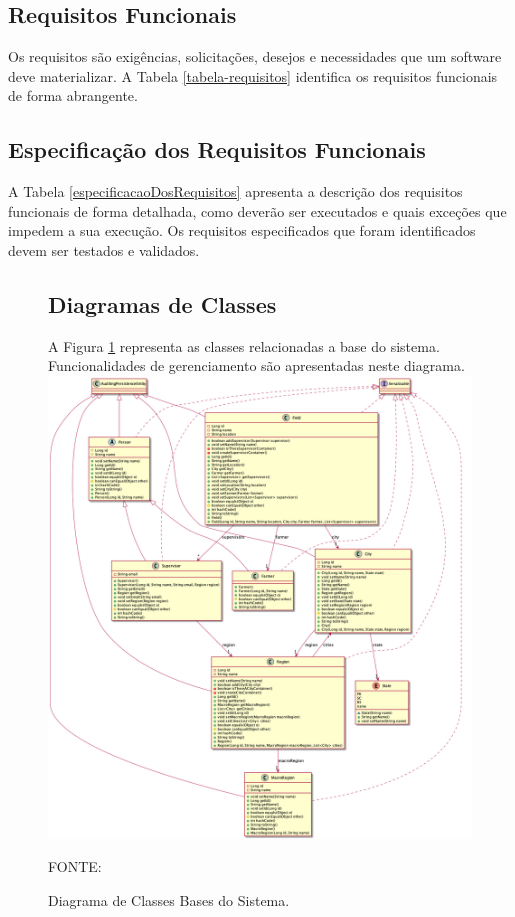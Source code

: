 \subsection{Requisitos Funcionais}
Os requisitos são exigências, solicitações, desejos e necessidades que um software deve materializar. A Tabela \ref{tabela-requisitos} identifica os requisitos funcionais de forma abrangente.  



\subsection{Especificação dos Requisitos Funcionais}

A Tabela \ref{especificacaoDosRequisitos} apresenta a descrição dos requisitos funcionais de forma detalhada, como deverão ser executados e quais exceções que impedem a sua execução. Os requisitos especificados que foram identificados devem ser testados e validados. 



 

\begin{figure}[!h]

\subsection{Diagramas de Classes}

A Figura \ref{domain-base} representa as classes relacionadas a base do sistema. Funcionalidades de gerenciamento são apresentadas neste diagrama.
	\includegraphics[scale=0.35]{dados/figuras/domain-base-classes.png}
	\caption{Diagrama de Classes Bases do Sistema.}
	FONTE: \cite[https:~//github.com/gabrielcostasilva/emater-mip-datacollection-app/tree/DDDLike/mip/src/main/resources/UMLDiagrams]{gabriel}
	\label{domain-base}
\end{figure}


